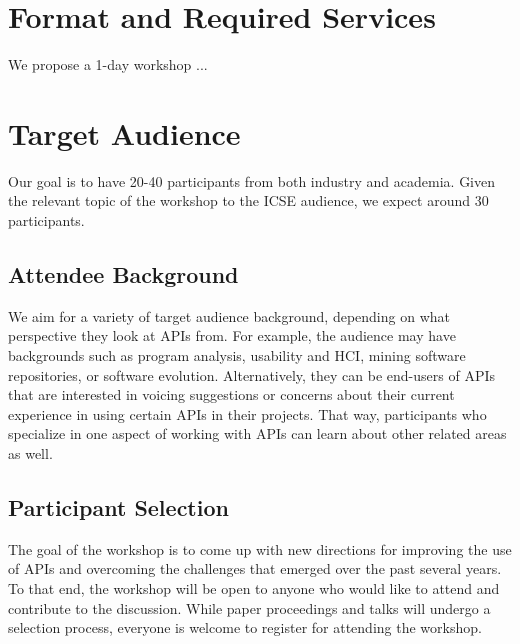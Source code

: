 \documentclass[10pt, conference]{IEEEtran}
\begin{document}
\section{Format and Required Services}

We propose a 1-day workshop ...

\section{Target Audience}

Our goal is to have 20-40 participants from both industry and academia. Given the relevant topic of the workshop to the ICSE audience, we expect around 30 participants.

\subsection{Attendee Background} 
We aim for a variety of target audience background, depending on what perspective they look at APIs from. For example, the audience may have backgrounds such as program analysis, usability and HCI, mining software repositories, or software evolution. Alternatively, they can be end-users of APIs that are interested in voicing suggestions or concerns about their current experience in using certain APIs in their projects. That way, participants who specialize in one aspect of working with APIs can learn about other related areas as well.

\subsection{Participant Selection}
The goal of the workshop is to come up with new directions for improving the use of APIs and overcoming the challenges that emerged over the past several years. To that end, the workshop will be open to anyone who would like to attend and contribute to the discussion. While paper proceedings and talks will undergo a selection process, everyone is welcome to register for attending the workshop. 
\end{document}
